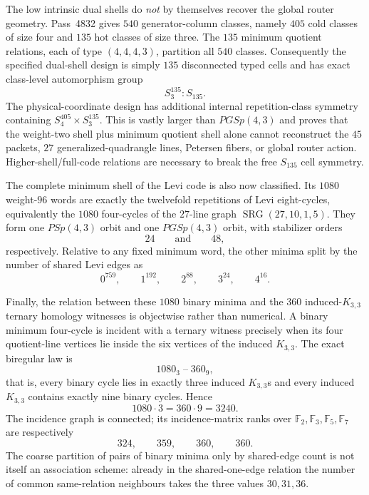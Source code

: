 The low intrinsic dual shells do \emph{not} by themselves recover the global router geometry.  Pass~4832 gives $540$ generator-column classes, namely $405$ cold classes of size four and $135$ hot classes of size three.  The $135$ minimum quotient relations, each of type $(4,4,4,3)$, partition all $540$ classes.  Consequently the specified dual-shell design is simply $135$ disconnected typed cells and has exact class-level automorphism group
\[
\boxed{S_3^{135}:S_{135}}.
\]
The physical-coordinate design has additional internal repetition-class symmetry containing $S_4^{405}\times S_3^{135}$.  This is vastly larger than $PGSp(4,3)$ and proves that the weight-two shell plus minimum quotient shell alone cannot reconstruct the $45$ packets, $27$ generalized-quadrangle lines, Petersen fibers, or global router action.  Higher-shell/full-code relations are necessary to break the free $S_{135}$ cell symmetry.

The complete minimum shell of the Levi code is also now classified.  Its $1080$ weight-$96$ words are exactly the twelvefold repetitions of Levi eight-cycles, equivalently the $1080$ four-cycles of the $27$-line graph $\operatorname{SRG}(27,10,1,5)$.  They form one $PSp(4,3)$ orbit and one $PGSp(4,3)$ orbit, with stabilizer orders
\[
24\qquad\text{and}\qquad48,
\]
respectively.  Relative to any fixed minimum word, the other minima split by the number of shared Levi edges as
\[
0^{759},\qquad1^{192},\qquad2^{88},\qquad3^{24},\qquad4^{16}.
\]

Finally, the relation between these $1080$ binary minima and the $360$ induced-$K_{3,3}$ ternary homology witnesses is objectwise rather than numerical.  A binary minimum four-cycle is incident with a ternary witness precisely when its four quotient-line vertices lie inside the six vertices of the induced $K_{3,3}$.  The exact biregular law is
\[
\boxed{1080_3\;\text{--}\;360_9},
\]
that is, every binary cycle lies in exactly three induced $K_{3,3}$s and every induced $K_{3,3}$ contains exactly nine binary cycles.  Hence
\[
1080\cdot3=360\cdot9=3240.
\]
The incidence graph is connected; its incidence-matrix ranks over $\mathbb F_2,\mathbb F_3,\mathbb F_5,\mathbb F_7$ are respectively
\[
324,\qquad359,\qquad360,\qquad360.
\]
The coarse partition of pairs of binary minima only by shared-edge count is not itself an association scheme: already in the shared-one-edge relation the number of common same-relation neighbours takes the three values $30,31,36$.

